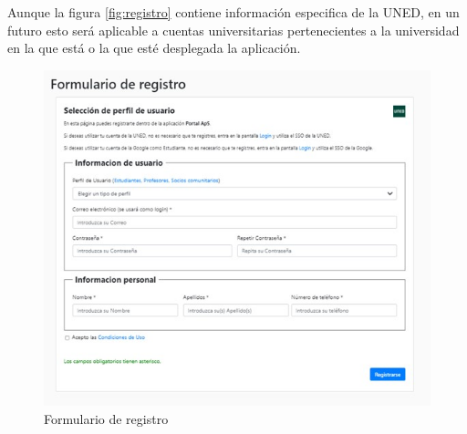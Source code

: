 \documentclass[11pt]{book}
\begin{document}
 Aunque la figura \ref{fig:registro} contiene información especifica de la UNED, en un futuro esto será aplicable a cuentas universitarias pertenecientes a la universidad en la que está o la que esté desplegada la aplicación.
 
 
 \begin{figure}[t]
 	\centering
 	\includegraphics[scale=0.7]{registro}
 	\caption{Formulario de registro}
 \end{figure}
 
\end{document}
